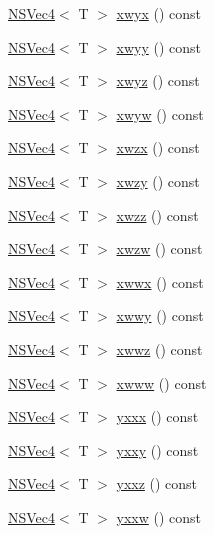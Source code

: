 \begin{DoxyCompactItemize}
\item 
\hyperlink{structNSVec4}{N\-S\-Vec4}$<$ T $>$ \hyperlink{structNSVec4_a9b685427878d2938fb31dd78e17261e6}{xwyx} () const 
\item 
\hyperlink{structNSVec4}{N\-S\-Vec4}$<$ T $>$ \hyperlink{structNSVec4_a0002abfe0589edb45e96094377a5ef06}{xwyy} () const 
\item 
\hyperlink{structNSVec4}{N\-S\-Vec4}$<$ T $>$ \hyperlink{structNSVec4_afba6540c41752347878d77c03857a0c4}{xwyz} () const 
\item 
\hyperlink{structNSVec4}{N\-S\-Vec4}$<$ T $>$ \hyperlink{structNSVec4_a38c61c8e98f5e04abd5a4acb9ed3495d}{xwyw} () const 
\item 
\hyperlink{structNSVec4}{N\-S\-Vec4}$<$ T $>$ \hyperlink{structNSVec4_a1d29c94053acec17bf629e5ade75a3de}{xwzx} () const 
\item 
\hyperlink{structNSVec4}{N\-S\-Vec4}$<$ T $>$ \hyperlink{structNSVec4_a4d905253f9c824943b056eafb1cefef3}{xwzy} () const 
\item 
\hyperlink{structNSVec4}{N\-S\-Vec4}$<$ T $>$ \hyperlink{structNSVec4_af2a8f53a53930a675fb268f7530bd078}{xwzz} () const 
\item 
\hyperlink{structNSVec4}{N\-S\-Vec4}$<$ T $>$ \hyperlink{structNSVec4_aba0e4b18ace6b9b63a929222a4dcc42d}{xwzw} () const 
\item 
\hyperlink{structNSVec4}{N\-S\-Vec4}$<$ T $>$ \hyperlink{structNSVec4_a15d1c78cdfecbc846765942d3dd36557}{xwwx} () const 
\item 
\hyperlink{structNSVec4}{N\-S\-Vec4}$<$ T $>$ \hyperlink{structNSVec4_a1b69b4384c0512745236ca16d16e6c36}{xwwy} () const 
\item 
\hyperlink{structNSVec4}{N\-S\-Vec4}$<$ T $>$ \hyperlink{structNSVec4_af61007be95ed6bcecccc2992548f3664}{xwwz} () const 
\item 
\hyperlink{structNSVec4}{N\-S\-Vec4}$<$ T $>$ \hyperlink{structNSVec4_a51c826d7927c99d53b0129b7e97a9e96}{xwww} () const 
\item 
\hyperlink{structNSVec4}{N\-S\-Vec4}$<$ T $>$ \hyperlink{structNSVec4_a6b3afb81364cbbf99cf27e2ef29d7936}{yxxx} () const 
\item 
\hyperlink{structNSVec4}{N\-S\-Vec4}$<$ T $>$ \hyperlink{structNSVec4_a133d29b2164e711c034d44fce8545dbc}{yxxy} () const 
\item 
\hyperlink{structNSVec4}{N\-S\-Vec4}$<$ T $>$ \hyperlink{structNSVec4_a98e08e9091c1744630772d5c65f226b8}{yxxz} () const 
\item 
\hyperlink{structNSVec4}{N\-S\-Vec4}$<$ T $>$ \hyperlink{structNSVec4_ac1d9a39987badcfccdd6fb9fdfffdd7a}{yxxw} () const 

\end{DoxyCompactItemize}
